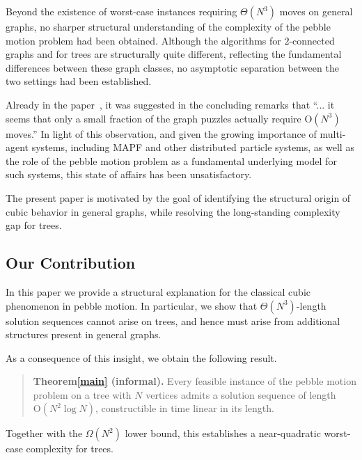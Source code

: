 \documentclass[letter,11pt]{article}
\theoremstyle{definition}
\theoremstyle{definition}
\newcommand{\1}{\boldmath$~1~$\unboldmath}
\newcommand{\Ord}{\mathrm{O}}
\newcommand{\tume}{\hspace*{0.2em}}
\begin{document}
Beyond the existence of worst-case instances requiring
$\Theta(N^3)$ moves on general graphs, no sharper structural understanding 
of the complexity of the pebble motion problem had been obtained.
Although the algorithms for $2$-connected graphs and for trees
are structurally quite different, reflecting the fundamental
differences between these graph classes,
no asymptotic separation between the two settings had been established. 

Already in the paper~\cite{715921},
it was suggested in the concluding remarks that
``... it seems that only a small fraction of the graph puzzles actually
require $\Ord(N^3)$ moves.''
In light of this observation, and given the growing importance of
multi-agent systems, including MAPF and other distributed particle systems,
as well as the role of the pebble motion problem as a
fundamental underlying model for such systems,
this state of affairs has been unsatisfactory.

The present paper is motivated by the goal of identifying the structural
origin of cubic behavior in general graphs, while resolving the
long-standing complexity gap for trees.


\subsection{Our Contribution}


In this paper we provide a structural explanation for 
the classical cubic phenomenon in pebble motion.
In particular, we show that $\Theta(N^3)$-length solution sequences 
cannot arise on trees, and hence must arise from additional
structures present in general graphs.

As a consequence of this insight, we obtain the following result.
\begin{quote}
\textbf{Theorem\tume\ref{main} (informal).}
Every feasible instance of the pebble motion problem
on a tree with $N$ vertices admits a solution sequence
of length $\Ord(N^2 \log N)$, constructible in time linear in its length.
\end{quote}
Together with the $\Omega(N^2)$ lower bound,
this establishes a near-quadratic worst-case complexity for trees.
\end{document}
